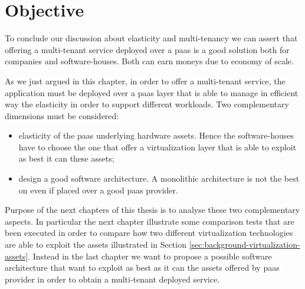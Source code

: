 %
%
\section{Objective}
\label{sec:elasticity-objective}
To conclude our discussion about elasticity and multi-tenancy we can assert that offering a multi-tenant
service deployed over a \ac{paas} is a good solution both for companies and software-houses. Both can
earn moneys due to economy of scale.

As we just argued in this chapter, in order to offer a multi-tenant service, the application must be
deployed over a \ac{paas} layer that is able to manage in efficient way the elasticity in order to
support different workloads. Two complementary dimensions must be considered:

\begin{itemize}
	\item{elasticity of the \ac{paas} underlying hardware assets. Hence the software-houses have to
		choose the one that offer a virtualization layer that is able to exploit as best it can these
		assets;}
	\item{design a good software architecture. A monolithic architecture is not the best on even if
		placed over a good \ac{paas} provider.}
\end{itemize}

Purpose of the next chapters of this thesis is to analyse these two complementary aspects. In particular
the next chapter illustrate some comparison tests that are been executed in order to compare how two
different virtualization technologies are able to exploit the assets illustrated in Section
\ref{sec:background-virtualization-assets}. Instead in the last chapter we want to propose a possible
software architecture that want to exploit as best as it can the assets offered by \ac{paas} provider
in order to obtain a multi-tenant deployed service.